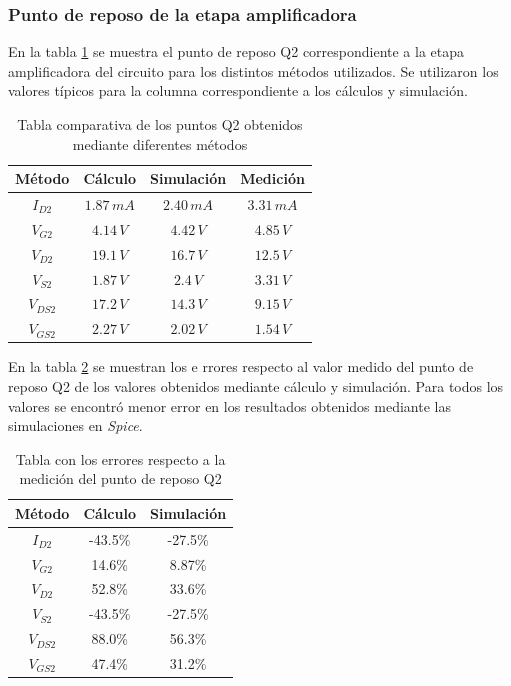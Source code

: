 \documentclass[10pt,spanish,a4paper,notitlepage]{article}
\begin{document}
\subsubsection{Punto de reposo de la etapa amplificadora}

En la tabla \ref{table:B_comparacion_Q2} se muestra el punto de reposo
Q2 correspondiente a la etapa amplificadora del circuito para los distintos
métodos utilizados. Se utilizaron los valores típicos para la columna
correspondiente a los cálculos y simulación.

\begin{table}[H]
\centering
\begin{tabular}{|c|c|c|c|} %
\hline
Método & Cálculo &  Simulación & Medición \\ \hline
$I_{D2}$ & $1.87\,\unit{mA}$  &  $2.40\,\unit{mA}$ & $3.31\,\unit{mA}$   \\ \hline
$V_{G2}$ & $4.14\,\unit{V}$ & $4.42\,\unit{V}$  &  $4.85\,\unit{V}$  \\ \hline
$V_{D2}$ & $19.1\,\unit{V}$ & $16.7\,\unit{V}$  &  $12.5\,\unit{V}$  \\ \hline
$V_{S2}$ & $1.87\,\unit{V}$ & $2.4\,\unit{V}$  &  $3.31\,\unit{V}$  \\ \hline
$V_{DS2}$ & $17.2\,\unit{V}$ & $14.3\,\unit{V}$  &  $9.15\,\unit{V}$  \\ \hline
$V_{GS2}$ & $2.27\,\unit{V}$ & $2.02\,\unit{V}$ & $1.54\,\unit{V}$  \\ \hline
\end{tabular}
\caption{Tabla comparativa de los puntos Q2 obtenidos mediante diferentes métodos}
\label{table:B_comparacion_Q2}
\end{table}

En la tabla \ref{table:B_errores_Q2} se muestran los e rrores respecto al valor medido
del punto de reposo Q2 de los valores obtenidos mediante cálculo y simulación.
Para todos los valores se encontró menor error en los resultados obtenidos
mediante las simulaciones en \emph{Spice}.


\begin{table}[H]
\centering
\begin{tabular}{|c|c|c|} %
\hline
Método & Cálculo &  Simulación  \\ \hline
$I_{D2}$ & -43.5\%  & -27.5\%  \\ \hline
$V_{G2}$ & 14.6\% & 8.87\% \\ \hline
$V_{D2}$ & 52.8\% & 33.6\%  \\ \hline
$V_{S2}$ & -43.5\% & -27.5\%  \\ \hline
$V_{DS2}$ & 88.0\% & 56.3\%  \\ \hline
$V_{GS2}$ & 47.4\% & 31.2\%  \\ \hline
\end{tabular}
\caption{Tabla con los errores respecto a la medición del punto de reposo Q2}
\label{table:B_errores_Q2}
\end{table}
\end{document}
